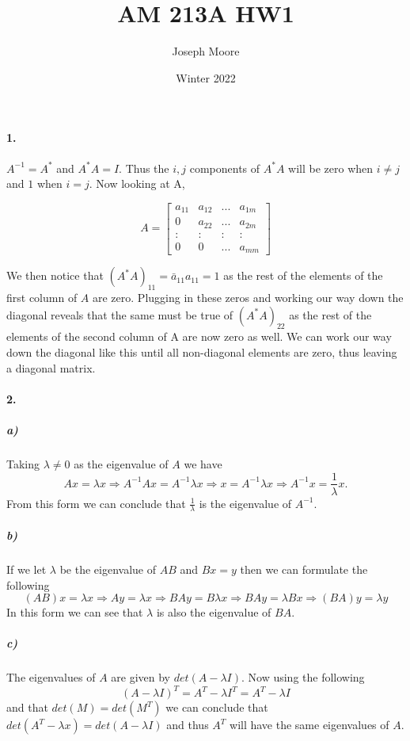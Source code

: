 \documentclass[12pt]{article}
\title{AM 213A HW1}
\author{Joseph Moore}
\date{Winter 2022}
\begin{document}
\maketitle

\paragraph{1.}
    
    $A^{-1} = A^*$ and $A^*A = I$. Thus the $i,j$ components of $A^*A$ will be zero when $i\ne j$ and $1$ when $i = j$. Now looking at A,
    
    \[ A = 
    \left[\begin{matrix}
    a_{11} & a_{12} & ... & a_{1m}\\
    0 & a_{22} & ... & a_{2m}\\
    : & : & : & :\\
    0 & 0 & ... & a_{mm}
    \end{matrix}\right]
    \]
    
    We then notice that $(A^*A)_{11} = \bar{a}_{11}a_{11} = 1$ as the rest of the elements of the first column of $A$ are zero. Plugging in these zeros and working our way down the diagonal reveals that the same must be true of $(A^*A)_{22}$ as the rest of the elements of the second column of A are now zero as well. We can work our way down the diagonal like this until all non-diagonal elements are zero, thus leaving a diagonal matrix. 
    
    
\paragraph{2.}
	\subparagraph{a)}
		Taking $\lambda \ne 0$ as the eigenvalue of $A$ we have
		\[
		Ax = \lambda x 
		\Rightarrow A^{-1}Ax = A^{-1} \lambda x 
		\Rightarrow x = A^{-1} \lambda x
		\Rightarrow A^{-1} x = \frac{1}{\lambda} x.
		\]
		From this form we can conclude that $\frac{1}{\lambda}$ is the eigenvalue of $A^{-1}$.
		
	\subparagraph{b)}
		If we let $\lambda$ be the eigenvalue of $AB$ and $Bx = y$ then we can formulate the following
		\[
		(AB)x = \lambda x
		\Rightarrow Ay = \lambda x
		\Rightarrow BAy = B\lambda x
		\Rightarrow BAy = \lambda Bx
		\Rightarrow (BA)y = \lambda y
		\]
		In this form we can see that $\lambda$ is also the eigenvalue of $BA$.		
		
	\subparagraph{c)}
		The eigenvalues of $A$ are given by $det(A - \lambda I)$. Now using the following
		\[
		(A - \lambda I)^T = A^T - \lambda I^T = A^T - \lambda I
		\]	
		and that $det(M) = det(M^T)$ we can conclude that $det(A^T - \lambda x) = det(A - \lambda I)$ and thus $A^T$ will have the same eigenvalues of $A$.
\end{document}
